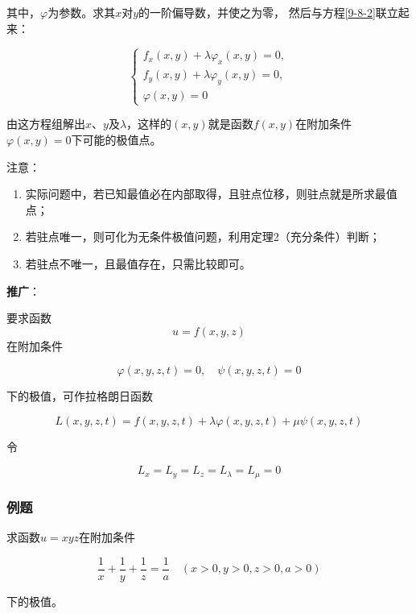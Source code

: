\documentclass[12pt, a4paper]{article}
\numberwithin{equation}{section}
\begin{document}
    其中，\(\varphi\)为参数。求其\(x \)对\(y\)的一阶偏导数，并使之为零，
    然后与方程\ref{9-8-2}联立起来：

    \begin{equation}
        \left\{\begin{array}{l}
            f_x(x, y)+\lambda \varphi_x(x, y)=0, \\
            f_y(x, y)+\lambda \varphi_y(x, y)=0, \\
            \varphi(x, y)=0
        \end{array}\right.
    \end{equation}

    由这方程组解出\(x \)、\(y \)及\(\lambda\)，这样的\(\left(x,y \right)\)就是函数\(f\left(x,y \right)\)在附加条件
    \(\varphi\left(x,y \right)=0\)下可能的极值点。
    \vspace{1em}

    注意：

    \begin{enumerate}
        \item 实际问题中，若已知最值必在内部取得，且驻点位移，则驻点就是所求最值点；
        \item 若驻点唯一，则可化为无条件极值问题，利用定理2（充分条件）判断；
        \item 若驻点不唯一，且最值存在，只需比较即可。
    \end{enumerate}

    \textbf{推广}：

    要求函数\[u=f\left(x,y,z\right)\]在附加条件

    $$
        \varphi(x, y, z, t)=0, \quad \psi(x, y, z, t)=0
    $$

    下的极值，可作拉格朗日函数
    
    $$
        L(x, y, z, t)=f(x, y, z, t)+\lambda \varphi(x, y, z, t)+\mu \psi(x, y, z, t)
    $$

    令

    $$
        L_x=L_y=L_z=L_\lambda=L_\mu=0
    $$

\subsubsection{例题}

    求函数\(u=xyz\)在附加条件

    $$
        \frac{1}{x}+\frac{1}{y}+\frac{1}{z}=\frac{1}{a} \quad(x>0, y>0, z>0, a>0)
    $$

    下的极值。
    \vspace{1em}
\end{document}
